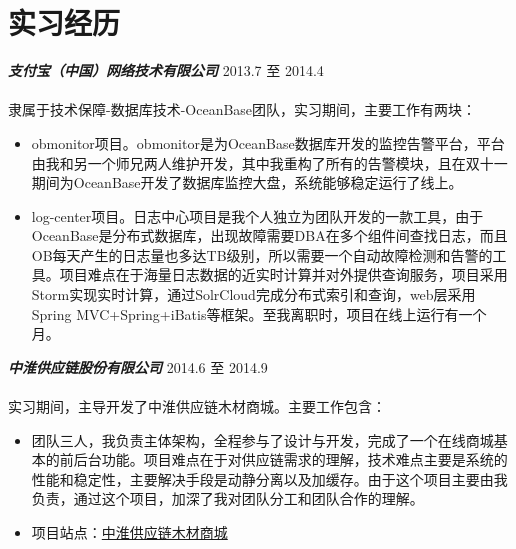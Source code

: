 \documentclass[10pt]{article} %
\begin{document}
\color{text1} %




\begin{minipage}[t]{0.6\textwidth} %
\vspace{0pt} %



\section{实习经历}

{\bf \large \textit{支付宝（中国）网络技术有限公司}} \hfill  \hfill {2013.7 至 2014.4\\}\\
{隶属于技术保障-数据库技术-OceanBase团队，实习期间，主要工作有两块：}
\begin{itemize} \itemsep -1pt 
\item obmonitor项目。obmonitor是为OceanBase数据库开发的监控告警平台，平台由我和另一个师兄两人维护开发，其中我重构了所有的告警模块，且在双十一期间为OceanBase开发了数据库监控大盘，系统能够稳定运行了线上。
\item log-center项目。日志中心项目是我个人独立为团队开发的一款工具，由于OceanBase是分布式数据库，出现故障需要DBA在多个组件间查找日志，而且OB每天产生的日志量也多达TB级别，所以需要一个自动故障检测和告警的工具。项目难点在于海量日志数据的近实时计算并对外提供查询服务，项目采用Storm实现实时计算，通过SolrCloud完成分布式索引和查询，web层采用Spring MVC+Spring+iBatis等框架。至我离职时，项目在线上运行有一个月。
\end{itemize}

{\bf \large \textit{中淮供应链股份有限公司}} \hfill  \hfill {2014.6 至 2014.9\\}\\
{实习期间，主导开发了中淮供应链木材商城。主要工作包含：}
\begin{itemize} \itemsep -1pt
\item 团队三人，我负责主体架构，全程参与了设计与开发，完成了一个在线商城基本的前后台功能。项目难点在于对供应链需求的理解，技术难点主要是系统的性能和稳定性，主要解决手段是动静分离以及加缓存。由于这个项目主要由我负责，通过这个项目，加深了我对团队分工和团队合作的理解。
\item 项目站点：\href{http://www.zhchain.com}{中淮供应链木材商城}
\end{itemize}



\end{minipage}
\end{document}
